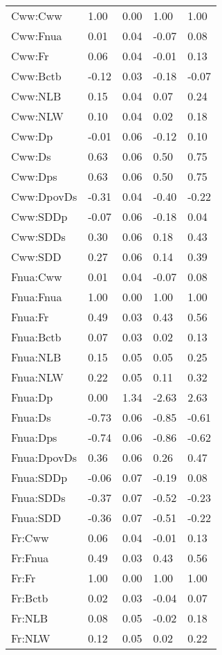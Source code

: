 \begin{center}
\begin{longtable}{|p{0.9in}|p{0.7in}|p{0.7in}|p{0.7in}|p{0.7in}|}
Cww:Cww & 1.00 & 0.00 & 1.00 & 1.00 \\ 
  Cww:Fnua & 0.01 & 0.04 & -0.07 & 0.08 \\ 
  Cww:Fr & 0.06 & 0.04 & -0.01 & 0.13 \\ 
  Cww:Bctb & -0.12 & 0.03 & -0.18 & -0.07 \\ 
  Cww:NLB & 0.15 & 0.04 & 0.07 & 0.24 \\ 
  Cww:NLW & 0.10 & 0.04 & 0.02 & 0.18 \\ 
  Cww:Dp & -0.01 & 0.06 & -0.12 & 0.10 \\ 
  Cww:Ds & 0.63 & 0.06 & 0.50 & 0.75 \\ 
  Cww:Dps & 0.63 & 0.06 & 0.50 & 0.75 \\ 
  Cww:DpovDs & -0.31 & 0.04 & -0.40 & -0.22 \\ 
  Cww:SDDp & -0.07 & 0.06 & -0.18 & 0.04 \\ 
  Cww:SDDs & 0.30 & 0.06 & 0.18 & 0.43 \\ 
  Cww:SDD & 0.27 & 0.06 & 0.14 & 0.39 \\ 
  Fnua:Cww & 0.01 & 0.04 & -0.07 & 0.08 \\ 
  Fnua:Fnua & 1.00 & 0.00 & 1.00 & 1.00 \\ 
  Fnua:Fr & 0.49 & 0.03 & 0.43 & 0.56 \\ 
  Fnua:Bctb & 0.07 & 0.03 & 0.02 & 0.13 \\ 
  Fnua:NLB & 0.15 & 0.05 & 0.05 & 0.25 \\ 
  Fnua:NLW & 0.22 & 0.05 & 0.11 & 0.32 \\ 
  Fnua:Dp & 0.00 & 1.34 & -2.63 & 2.63 \\ 
  Fnua:Ds & -0.73 & 0.06 & -0.85 & -0.61 \\ 
  Fnua:Dps & -0.74 & 0.06 & -0.86 & -0.62 \\ 
  Fnua:DpovDs & 0.36 & 0.06 & 0.26 & 0.47 \\ 
  Fnua:SDDp & -0.06 & 0.07 & -0.19 & 0.08 \\ 
  Fnua:SDDs & -0.37 & 0.07 & -0.52 & -0.23 \\ 
  Fnua:SDD & -0.36 & 0.07 & -0.51 & -0.22 \\ 
  Fr:Cww & 0.06 & 0.04 & -0.01 & 0.13 \\ 
  Fr:Fnua & 0.49 & 0.03 & 0.43 & 0.56 \\ 
  Fr:Fr & 1.00 & 0.00 & 1.00 & 1.00 \\ 
  Fr:Bctb & 0.02 & 0.03 & -0.04 & 0.07 \\ 
  Fr:NLB & 0.08 & 0.05 & -0.02 & 0.18 \\ 
  Fr:NLW & 0.12 & 0.05 & 0.02 & 0.22 \\ 

\end{longtable}
\end{center}
